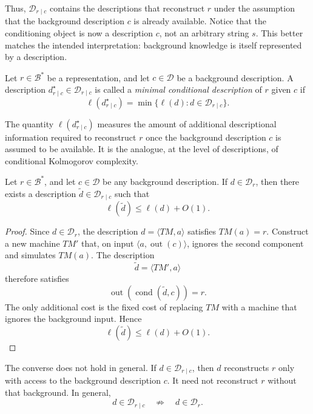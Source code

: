 Thus, \(\mathcal D_{r\mid c}\) contains the descriptions that reconstruct
\(r\) under the assumption that the background description \(c\) is already
available. Notice that the conditioning object is now a description \(c\), not
an arbitrary string \(s\). This better matches the intended interpretation:
background knowledge is itself represented by a description.

\begin{definition}
\label{def:minimal_conditional_description}
Let \(r\in\mathcal B^\ast\) be a representation, and let
\(c\in\mathcal D\) be a background description. A description
\(d^\star_{r\mid c}\in\mathcal D_{r\mid c}\) is called a
\emph{minimal conditional description}
of \(r\) given \(c\) if
\[
\ell(d^\star_{r\mid c})
=
\min\{\ell(d):d\in\mathcal D_{r\mid c}\}.
\]
\end{definition}

The quantity \(\ell(d^\star_{r\mid c})\) measures the amount of additional
descriptional information required to reconstruct \(r\) once the background
description \(c\) is assumed to be available. It is the analogue, at the level
of descriptions, of conditional Kolmogorov complexity.

\begin{proposition}
\label{prop:description_implies_conditional}
Let \(r\in\mathcal B^\ast\), and let \(c\in\mathcal D\) be any background
description. If \(d\in\mathcal D_r\), then there exists a description
\(\widetilde d\in\mathcal D_{r\mid c}\) such that
\[
\ell(\widetilde d)\leq \ell(d)+O(1).
\]
\end{proposition}

\begin{proof}
Since \(d\in\mathcal D_r\), the description \(d=\langle TM,a\rangle\)
satisfies \(TM(a)=r\). Construct a new machine \(TM'\) that, on input
\(\langle a,\operatorname{out}(c)\rangle\), ignores the second component and
simulates \(TM(a)\). The description
\[
\widetilde d=\langle TM',a\rangle
\]
therefore satisfies
\[
\operatorname{out}(\operatorname{cond}(\widetilde d,c))=r.
\]
The only additional cost is the fixed cost of replacing \(TM\) with a machine
that ignores the background input. Hence
\[
\ell(\widetilde d)\leq \ell(d)+O(1).
\]
\end{proof}

The converse does not hold in general. If \(d\in\mathcal D_{r\mid c}\), then
\(d\) reconstructs \(r\) only with access to the background description \(c\).
It need not reconstruct \(r\) without that background. In general,
\[
d\in\mathcal D_{r\mid c}
\quad\not\Rightarrow\quad
d\in\mathcal D_r.
\]


